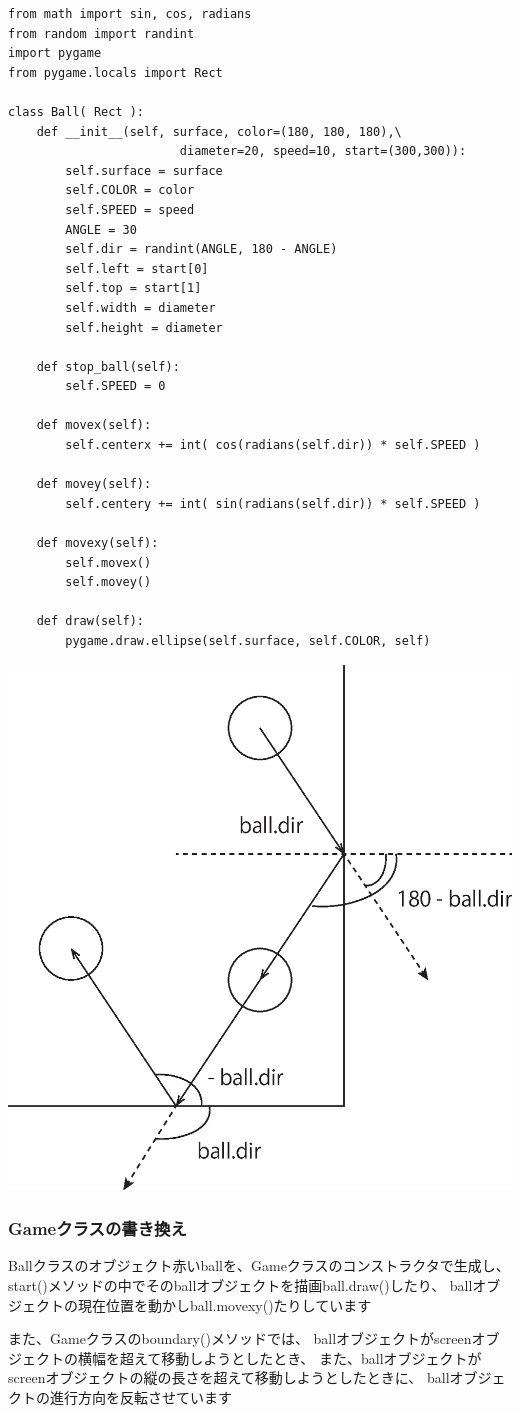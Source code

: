 \documentclass[uplatex,a4paper,11pt,oneside,openany]{jsbook}
\begin{document}
\begin{lstlisting}[caption=Ballクラス,label=p3]
from math import sin, cos, radians
from random import randint
import pygame
from pygame.locals import Rect

class Ball( Rect ):
    def __init__(self, surface, color=(180, 180, 180),\
                        diameter=20, speed=10, start=(300,300)):
        self.surface = surface
        self.COLOR = color
        self.SPEED = speed
        ANGLE = 30
        self.dir = randint(ANGLE, 180 - ANGLE)
        self.left = start[0]
        self.top = start[1]
        self.width = diameter
        self.height = diameter

    def stop_ball(self):
        self.SPEED = 0

    def movex(self):
        self.centerx += int( cos(radians(self.dir)) * self.SPEED )

    def movey(self):
        self.centery += int( sin(radians(self.dir)) * self.SPEED )

    def movexy(self):
        self.movex()
        self.movey()

    def draw(self):
        pygame.draw.ellipse(self.surface, self.COLOR, self)
\end{lstlisting}

\begin{center}
  \includegraphics[width=0.4\hsize]{./figure/boundball.eps}
\end{center}

\subsubsection{Gameクラスの書き換え}

Ballクラスのオブジェクト赤いballを、Gameクラスのコンストラクタで生成し、
start()メソッドの中でそのballオブジェクトを描画ball.draw()したり、
ballオブジェクトの現在位置を動かしball.movexy()たりしています

また、Gameクラスのboundary()メソッドでは、
ballオブジェクトがscreenオブジェクトの横幅を超えて移動しようとしたとき、
また、ballオブジェクトがscreenオブジェクトの縦の長さを超えて移動しようとしたときに、
ballオブジェクトの進行方向を反転させています
\end{document}
